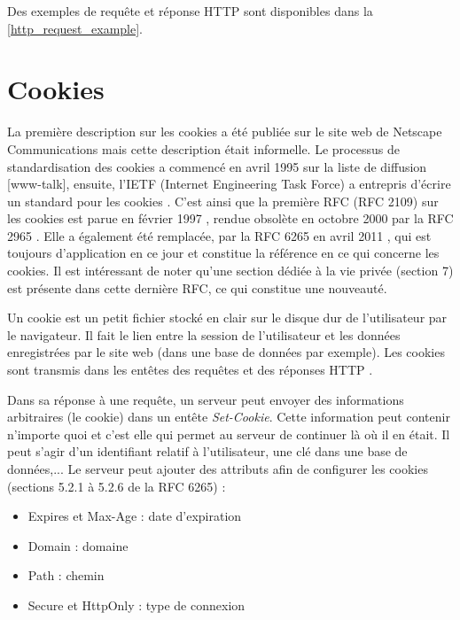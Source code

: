 Des exemples de requête et réponse HTTP sont disponibles dans la \autoref{http_request_example}.

\newpage
\section{Cookies}
La première description sur les cookies a été publiée sur le site web de Netscape Communications mais cette description était informelle. Le processus de standardisation des cookies a commencé en avril 1995 sur la liste de diffusion [www-talk], ensuite, l'IETF (Internet Engineering Task Force) a entrepris d'écrire un standard pour les cookies \cite{Kristol:2001:HCS:502152.502153}. C'est ainsi que la première RFC (RFC 2109) sur les cookies est parue en février 1997 \cite{IETF_RFC2109}, rendue obsolète en octobre 2000 par la RFC 2965 \cite{IETF_RFC2965}. Elle a également été remplacée, par la RFC 6265 en avril 2011 \cite{IETF_RFC6265}, qui est toujours d'application en ce jour et constitue la référence en ce qui concerne les cookies. Il est intéressant de noter qu'une section dédiée à la vie privée (section 7) est présente dans cette dernière RFC, ce qui constitue une nouveauté.
\newline

Un cookie est un petit fichier stocké en clair sur le disque dur de l'utilisateur par le navigateur. Il fait le lien entre la session de l'utilisateur et les données enregistrées par le site web (dans une base de données par exemple). Les cookies sont transmis dans les entêtes des requêtes et des réponses HTTP \cite{IETF_RFC6265}.
\newline

Dans sa réponse à une requête, un serveur peut envoyer des informations arbitraires (le cookie) dans un entête \textit{Set-Cookie}. Cette information peut contenir n'importe quoi et c'est elle qui permet au serveur de continuer là où il en était. Il peut s'agir d'un identifiant relatif à l'utilisateur, une clé dans une base de données,...
Le serveur peut ajouter des attributs afin de configurer les cookies (sections 5.2.1 à 5.2.6 de la RFC 6265) \cite{IETF_RFC6265} :

\begin{itemize}
	\item Expires et Max-Age : date d'expiration
	\item Domain : domaine
	\item Path : chemin
	\item Secure et HttpOnly : type de connexion
	\newline
\end{itemize}

